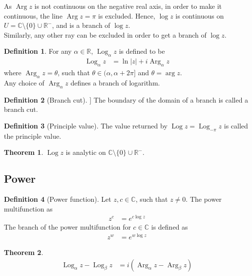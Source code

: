 \documentclass[titlepage, fleqn, a4paper, 12pt, twoside]{article}
\theoremstyle{definition}
\newtheorem{definition}{Definition}
\theoremstyle{theorem}
\newtheorem{theorem}{Theorem}
\DeclareMathOperator{\Arg}{Arg}
\DeclareMathOperator{\Log}{Log}
\begin{document}
As $\Arg z$ is not continuous on the negative real axis, in order to make it continuous, the line $\Arg z = \pi$ is excluded.
Hence, $\log z$ is continuous on $U = \mathbb{C} \setminus \{0\} \cup \mathbb{R}^-$, and is a branch of $\log z$.\\
Similarly, any other ray can be excluded in order to get a branch of $\log z$.\\

\begin{definition}
	For any $\alpha \in \mathbb{R}$, $\Log_{\alpha} z$ is defined to be
	\begin{align*}
		\Log_{\alpha} z &= \ln |z| + i \Arg_{\alpha} z
	\end{align*}
	where $\Arg_{\alpha} z = \theta$, such that $\theta \in (\alpha , \alpha + 2 \pi]$ and $\theta = \arg z$.\\
	Any choice of $\Arg_{\alpha} z$ defines a branch of logarithm.
\end{definition}

\begin{definition}[Branch cut]]
	The boundary of the domain of a branch is called a branch cut.
\end{definition}

\begin{definition}[Principle value]
	The value returned by $\Log z = \Log_{-\pi} z$ is called the principle value.
\end{definition}

\begin{theorem}
	$\Log z$ is analytic on $\mathbb{C} \setminus \{0\} \cup \mathbb{R}^-$.
\end{theorem}

\subsection{Power}

\begin{definition}[Power function]
	Let $z,c \in \mathbb{C}$, such that $z \neq 0$.
	The power multifunction as
	\begin{align*}
		z^c &= e^{c \log z}
	\end{align*}
	The branch of the power multifunction for $c \in \mathbb{C}$ is defined as
	\begin{align*}
		z^w &= e^{w \log z}
	\end{align*}
\end{definition}

\begin{theorem}
	\begin{align*}
		\Log_{\alpha} z - \Log_{\beta} z &= i \left( \Arg_{\alpha} z - \Arg_{\beta} z \right)
	\end{align*}
\end{theorem}
\end{document}
